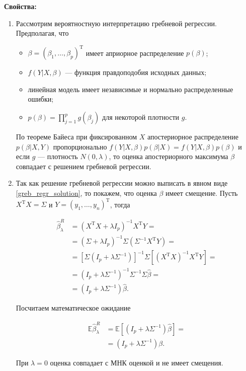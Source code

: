 \documentclass[specialist,
               subf,href,colorlinks=true, 12pt,a4paper]{article} %
\newcommand{\E}{\mathbb{E}}
\newcommand{\T}{\mathrm{T}}
\numberwithin{equation}{section}
\begin{document}
\textbf{Свойства:}
\begin{enumerate}
\item Рассмотрим вероятностную интерпретацию гребневой регрессии. Предполагая, что

\begin{itemize}
\item $\beta = (\beta_1, \ldots, \beta_p)^{\T}$ имеет априорное распределение $p(\beta)$;
\item $f(Y|X,\beta)$ --- функция правдоподобия исходных данных;
\item линейная модель имеет независимые и нормально распределенные ошибки; 
\item $p(\beta) = \prod_{j = 1}^p g(\beta_j)$ для некоторой плотности $g$.
\end{itemize}

По теореме Байеса при фиксированном $X$ апостериорное распределение $p(\beta|X,Y)$ пропорционально $f(Y|X,\beta)p(\beta|X) = f(Y|X,\beta)p(\beta)$ и если $g$ --- плотность $N(0,\lambda)$, то  оценка апостериорного максимума $\beta$ совпадает с решением гребневой регрессии.

\item Так как решение гребневой регрессии можно выписать в явном виде \eqref{greb_regr_solution}, то покажем, что оценка $\beta$ имеет смещение. Пусть $X^{\T}X = \Sigma$ и $Y = (y_1, \ldots, y_n)^{\T}$, тогда

\begin{align*}
\hat{\beta}_{\lambda}^R &= (X^{\T}X + \lambda I_p)^{-1}X^{\T}Y = \\
 &= (\Sigma + \lambda I_p)^{-1} \Sigma(\Sigma^{-1}X^{\T}Y) = \\
 &= [\Sigma(I_p + \lambda\Sigma^{-1})]^{-1} \Sigma[(X^{\T}X)^{-1}X^{\T}Y] = \\
 &= (I_p + \lambda \Sigma^{-1})^{-1} \Sigma^{-1} \Sigma \hat{\beta} = \\
 &= (I_p + \lambda \Sigma^{-1})\hat{\beta}.  
\end{align*}

Посчитаем математическое ожидание

\begin{align*}
\E\hat{\beta}_{\lambda}^{R} &= \E[(I_p + \lambda \Sigma^{-1})\hat{\beta}] = \\
	&= (I_p + \lambda \Sigma^{-1})\beta.
\end{align*} 

При $\lambda = 0$ оценка совпадает с МНК оценкой и не имеет смещения.
\end{enumerate}
\end{document}
